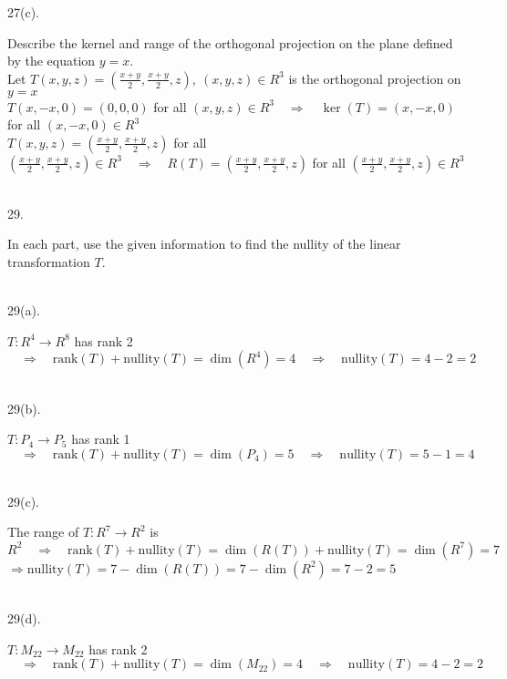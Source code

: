 \documentclass[12pt]{book}
\begin{document}
\begin{CJK}{UTF8}{bsmi}
27(c). \begin{minipage}[t]{\dimexpr\linewidth-2em}
Describe the kernel and range of the orthogonal projection on the plane defined by the equation $y=x$. \\
Let $\displaystyle T(x, y, z)=(\frac{x+y}{2}, \frac{x+y}{2}, z),\ (x, y, z)\in R^3$ is the orthogonal projection on $y=x$ \\
$\displaystyle T(x, -x, 0)=(0, 0, 0)$ for all $(x, y, z)\in R^3\quad\Rightarrow\quad\ker(T)=(x, -x, 0)$ for all $(x, -x, 0)\in R^3$ \\
$T(x, y, z)=(\frac{x+y}{2}, \frac{x+y}{2}, z)$ for all $(\frac{x+y}{2}, \frac{x+y}{2}, z)\in R^3\quad\Rightarrow\quad R(T)=(\frac{x+y}{2}, \frac{x+y}{2}, z)$ for all $(\frac{x+y}{2}, \frac{x+y}{2}, z)\in R^3$
\end{minipage}\\

29. \begin{minipage}[t]{\dimexpr\linewidth-2em}
In each part, use the given information to find the nullity of the linear transformation $T$.
\end{minipage}\\

29(a). \begin{minipage}[t]{\dimexpr\linewidth-2em}
$T:R^4\rightarrow R^8$ has rank 2$\quad\Rightarrow\quad\mathrm{rank}(T)+\mathrm{nullity}(T)=\dim(R^4)=4\quad\Rightarrow\quad\mathrm{nullity}(T)=4-2=2$
\end{minipage}\\

29(b). \begin{minipage}[t]{\dimexpr\linewidth-2em}
$T:P_4\rightarrow P_5$ has rank 1$\quad\Rightarrow\quad\mathrm{rank}(T)+\mathrm{nullity}(T)=\dim(P_4)=5\quad\Rightarrow\quad\mathrm{nullity}(T)=5-1=4$
\end{minipage}\\

29(c). \begin{minipage}[t]{\dimexpr\linewidth-2em}
The range of $T:R^7\rightarrow R^2$ is $R^2\quad\Rightarrow\quad\mathrm{rank}(T)+\mathrm{nullity}(T)=\dim(R(T))+\mathrm{nullity}(T)=\dim(R^7)=7$ \\
$\Rightarrow\mathrm{nullity}(T)=7-\dim(R(T))=7-\dim(R^2)=7-2=5$
\end{minipage}\\

29(d). \begin{minipage}[t]{\dimexpr\linewidth-2em}
$T:M_{22}\rightarrow M_{22}$ has rank 2$\quad\Rightarrow\quad\mathrm{rank}(T)+\mathrm{nullity}(T)=\dim(M_{22})=4\quad\Rightarrow\quad\mathrm{nullity}(T)=4-2=2$
\end{minipage}\\


\end{CJK}
\end{document}

